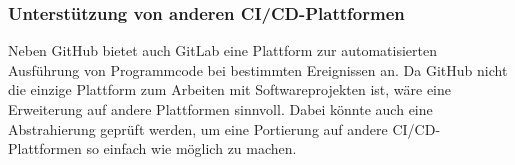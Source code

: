 \subsubsection{Unterstützung von anderen CI/CD-Plattformen}
Neben GitHub bietet auch GitLab eine Plattform zur automatisierten Ausführung von Programmcode bei bestimmten Ereignissen an. Da GitHub nicht die einzige Plattform zum Arbeiten mit Softwareprojekten ist, wäre eine Erweiterung auf andere Plattformen sinnvoll. Dabei könnte auch eine Abstrahierung geprüft werden, um eine Portierung auf andere \ac{CI/CD}-Plattformen so einfach wie möglich zu machen. 






